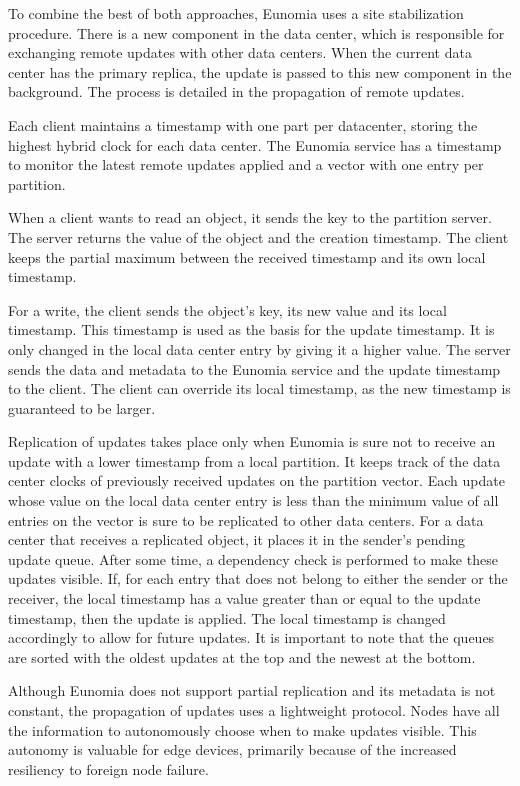To combine the best of both approaches, Eunomia uses a site stabilization procedure. There is a new component in the data center, which is responsible for exchanging remote updates with other data centers. When the current data center has the primary replica, the update is passed to this new component in the background. The process is detailed in the propagation of remote updates. 

Each client maintains a timestamp with one part per datacenter, storing the highest hybrid clock for each data center. The Eunomia service has a timestamp to monitor the latest remote updates applied and a vector with one entry per partition. 

When a client wants to read an object, it sends the key to the partition server. The server returns the value of the object and the creation timestamp. The client keeps the partial maximum between the received timestamp and its own local timestamp. 

For a write, the client sends the object's key, its new value and its local timestamp. This timestamp is used as the basis for the update timestamp. It is only changed in the local data center entry by giving it a higher value. The server sends the data and metadata to the Eunomia service and the update timestamp to the client. The client can override its local timestamp, as the new timestamp is guaranteed to be larger. 

Replication of updates takes place only when Eunomia is sure not to receive an update with a lower timestamp from a local partition. It keeps track of the data center clocks of previously received updates on the partition vector. Each update whose value on the local data center entry is less than the minimum value of all entries on the vector is sure to be replicated to other data centers. For a data center that receives a replicated object, it places it in the sender's pending update queue. After some time, a dependency check is performed to make these updates visible. If, for each entry that does not belong to either the sender or the receiver, the local timestamp has a value greater than or equal to the update timestamp, then the update is applied. The local timestamp is changed accordingly to allow for future updates. It is important to note that the queues are sorted with the oldest updates at the top and the newest at the bottom. 

Although Eunomia does not support partial replication and its metadata is not constant, the propagation of updates uses a lightweight protocol. Nodes have all the information to autonomously choose when to make updates visible. This autonomy is valuable for edge devices, primarily because of the increased resiliency to foreign node failure.

